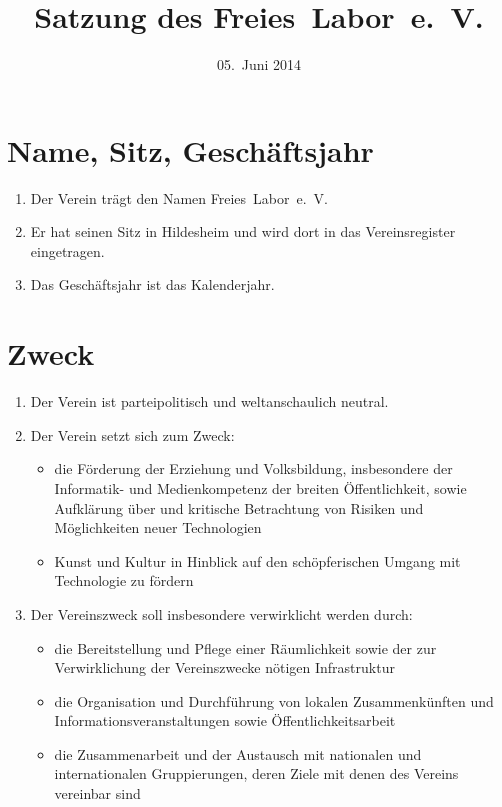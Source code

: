 \documentclass[a4paper,12pt]{scrartcl}
\title{Satzung des Freies~Labor~e.~V.}
\date{05.~Juni 2014}
\begin{document}
\maketitle


\section{Name, Sitz, Geschäftsjahr}
\begin{enumerate}
  \item Der Verein trägt den Namen Freies~Labor~e.~V.
  \item Er hat seinen Sitz in Hildesheim und wird dort in das Vereinsregister
    eingetragen.
  \item Das Geschäftsjahr ist das Kalenderjahr.
\end{enumerate}

\section{Zweck}
\begin{enumerate}
  \item Der Verein ist parteipolitisch und weltanschaulich neutral.
  \item Der Verein setzt sich zum Zweck:
    \begin{itemize}
      \item
         die Förderung der Erziehung und Volksbildung, insbesondere der
         Informatik- und Medienkompetenz der breiten Öffentlichkeit, sowie
         Aufklärung über und kritische Betrachtung von Risiken und
         Möglichkeiten neuer Technologien
      \item Kunst und Kultur in Hinblick auf den schöpferischen Umgang mit
        Technologie zu fördern
    \end{itemize}
  \item Der Vereinszweck soll insbesondere verwirklicht werden durch:
    \begin{itemize}
      \item die Bereitstellung und Pflege einer Räumlichkeit sowie der zur
        Verwirklichung der Vereinszwecke nötigen Infrastruktur
      \item die Organisation und Durchführung von lokalen Zusammenkünften und
        Informationsveranstaltungen sowie Öffentlichkeitsarbeit
      \item die Zusammenarbeit und der Austausch mit nationalen und
        internationalen Gruppierungen, deren Ziele mit denen des Vereins
        vereinbar sind
    \end{itemize}
\end{enumerate}
\end{document}
